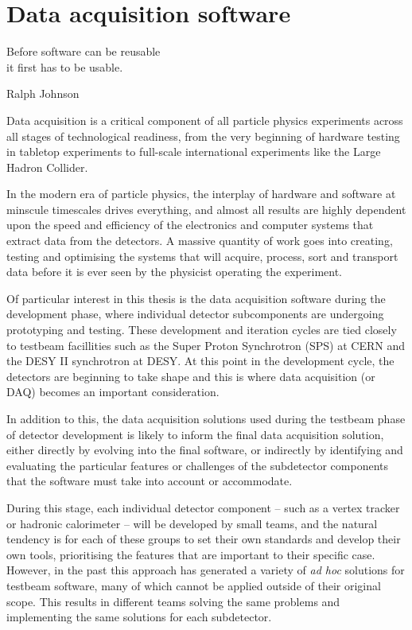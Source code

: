 \chapter{Data acquisition software}
\label{chapter:dqm4hep}

\epigraph{Before software can be reusable \\it first has to be usable.}{Ralph Johnson}

Data acquisition is a critical component of all particle physics experiments across all stages of technological readiness, from the very beginning of hardware testing in tabletop experiments to full-scale international experiments like the Large Hadron Collider. 

In the modern era of particle physics, the interplay of hardware and software at minscule timescales drives everything, and almost all results are highly dependent upon the speed and efficiency of the electronics and computer systems that extract data from the detectors. A massive quantity of work goes into creating, testing and optimising the systems that will acquire, process, sort and transport data before it is ever seen by the physicist operating the experiment.

Of particular interest in this thesis is the data acquisition software during the development phase, where individual detector subcomponents are undergoing prototyping and testing. These development and iteration cycles are tied closely to testbeam facillities such as the Super Proton Synchrotron (SPS) at CERN and the DESY II synchrotron at DESY. At this point in the development cycle, the detectors are beginning to take shape and this is where data acquisition (or DAQ) becomes an important consideration. 

In addition to this, the data acquisition solutions used during the testbeam phase of detector development is likely to inform the final data acquisition solution, either directly by evolving into the final software, or indirectly by identifying and evaluating the particular features or challenges of the subdetector components that the software must take into account or accommodate.

During this stage, each individual detector component -- such as a vertex tracker or hadronic calorimeter -- will be developed by small teams, and the natural tendency is for each of these groups to set their own standards and develop their own tools, prioritising the features that are important to their specific case. However, in the past this approach has generated a variety of \textit{ad hoc} solutions for testbeam software, many of which cannot be applied outside of their original scope. This results in different teams solving the same problems and implementing the same solutions for each subdetector.

